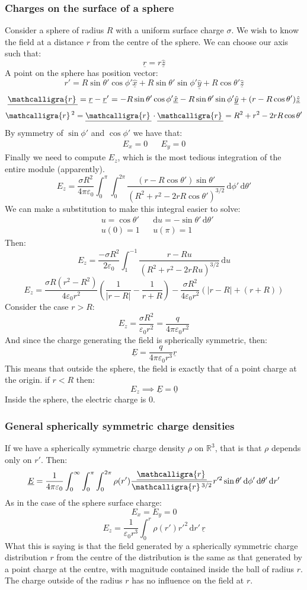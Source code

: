 \documentclass[12pt]{article}
\newcommand{\scriptr}{\ensuremath{\mathcalligra{r}}\,}
\begin{document}
\subsubsection{Charges on the surface of a sphere}
Consider a sphere of radius \(R\) with a uniform surface charge \(\sigma\). We wish to know the field at a distance \(r\) from the centre of the sphere. We can choose our axis such that:
\[\underline{r}=r\underline{\hat{z}}\]
A point on the sphere has position vector:
\[r'=R\sin\theta'\cos\phi'\underline{\hat{x}}+R\sin\theta'\sin\phi'\underline{\hat{y}}+R\cos\theta'\underline{\hat{z}}\]
\[\underline{\scriptr}=\underline{r}-\underline{r}'=-R\sin\theta'\cos\phi'\underline{\hat{x}}-R\sin\theta'\sin\phi'\underline{\hat{y}}+(r-R\cos\theta')\underline{\hat{z}}\]
\[\scriptr^2=\underline{\scriptr}\cdot\underline{\scriptr}=R^2+r^2-2rR\cos\theta'\]
By symmetry of \(\sin\phi'\) and \(\cos\phi'\) we have that:
\begin{align*}
    E_x=0 && E_y=0
\end{align*}
Finally we need to compute \(E_z\), which is the most tedious integration of the entire module (apparently).
\[E_z=\frac{\sigma R^2}{4\pi\varepsilon_0}\int^\pi_0\int^{2\pi}_0\frac{(r-R\cos\theta')\sin\theta'}{(R^2+r^2-2rR\cos\theta')^{3/2}}\,\text{d}\phi'\,\text{d}\theta'\]
We can make a substitution to make this integral easier to solve:
\begin{align*}
    &u=\cos\theta' && \text{d}u=-\sin\theta'\,\text{d}\theta' \\
    &u(0)=1 && u(\pi)=1
\end{align*}
Then:
\[E_z=\frac{-\sigma R^2}{2\varepsilon_0}\int^{-1}_1\frac{r-Ru}{(R^2+r^2-2rRu)^{3/2}}\,\text{d}u\]
\[E_z=\frac{\sigma R(r^2-R^2)}{4\varepsilon_0 r^2}\left(\frac{1}{|r-R|}-\frac{1}{r+R}\right)-\frac{\sigma R^2}{4\varepsilon_0 r^2}(|r-R|+(r+R))\]
Consider the case \(r>R\):
\[E_z=\frac{\sigma R^2}{\varepsilon_0 r^2}=\frac{q}{4\pi\varepsilon_0 r^2}\]
And since the charge generating the field is spherically symmetric, then:
\[\underline{E}=\frac{q}{4\pi\varepsilon_0 r^3}\underline{r}\]
This means that outside the sphere, the field is exactly that of a point charge at the origin. if \(r<R\) then:
\[E_z\implies \underline{E}=\underline{0}\]
Inside the sphere, the electric charge is 0.
\subsubsection{General spherically symmetric charge densities}
If we have a spherically symmetric charge density \(\rho\) on \(\mathbb{R}^3\), that is that \(\rho\) depends only on \(r'\). Then:
\[\underline{E}=\frac{1}{4\pi\varepsilon_0}\int^\infty_0\int^\pi_0\int^{2\pi}_0\rho(r')\frac{\underline{\scriptr}}{\scriptr^{3/2}}r'^2\sin\theta'\,\text{d}\phi'\,\text{d}\theta'\,\text{d}r'\]
As in the case of the sphere surface charge:
\[E_x=E_y=0\]
\[E_z=\frac{1}{\varepsilon_0 r^3}\int^r_0\rho(r')r'^2\,\text{d}r'\,\underline{r}\]
What this is saying is that the field generated by a spherically symmetric charge distribution \(r\) from the centre of the distribution is the same as that generated by a point charge at the centre, with magnitude contained inside the ball of radius \(r\). The charge outside of the radius \(r\) has no influence on the field at \(r\).
\end{document}
